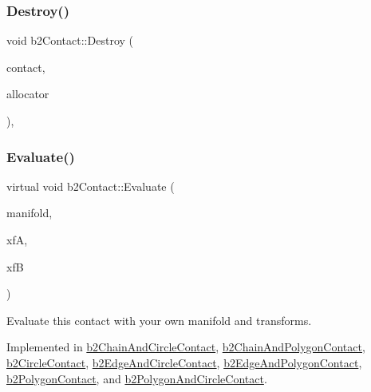 \mbox{\label{classb2_contact_ab57797a25c2206edf1ad7c4dcd1cbca5}} 
\subsubsection{\texorpdfstring{Destroy()}{Destroy()}\hspace{0.1cm}{\footnotesize\ttfamily [2/2]}}
{\footnotesize\ttfamily void b2\+Contact\+::\+Destroy (\begin{DoxyParamCaption}\item[{\mbox{\hyperlink{classb2_contact}{b2\+Contact}} $\ast$}]{contact,  }\item[{\mbox{\hyperlink{classb2_block_allocator}{b2\+Block\+Allocator}} $\ast$}]{allocator }\end{DoxyParamCaption})\hspace{0.3cm}{\ttfamily [static]}, {\ttfamily [protected]}}

\mbox{\label{classb2_contact_ae3c2842e5325b2d4500f8ed1d4de2f72}} 
\subsubsection{\texorpdfstring{Evaluate()}{Evaluate()}}
{\footnotesize\ttfamily virtual void b2\+Contact\+::\+Evaluate (\begin{DoxyParamCaption}\item[{\mbox{\hyperlink{structb2_manifold}{b2\+Manifold}} $\ast$}]{manifold,  }\item[{const \mbox{\hyperlink{structb2_transform}{b2\+Transform}} \&}]{xfA,  }\item[{const \mbox{\hyperlink{structb2_transform}{b2\+Transform}} \&}]{xfB }\end{DoxyParamCaption})\hspace{0.3cm}{\ttfamily [pure virtual]}}



Evaluate this contact with your own manifold and transforms. 



Implemented in \mbox{\hyperlink{classb2_chain_and_circle_contact_abdc7f895b76f99f7ddc444ed11986c89}{b2\+Chain\+And\+Circle\+Contact}}, \mbox{\hyperlink{classb2_chain_and_polygon_contact_a607e7a8b4b0a5ee9bfd100a365fb6f3b}{b2\+Chain\+And\+Polygon\+Contact}}, \mbox{\hyperlink{classb2_circle_contact_a90036965fd66469e916a5afc6c244092}{b2\+Circle\+Contact}}, \mbox{\hyperlink{classb2_edge_and_circle_contact_aec021f688dcf2b5a2c483edde476d4b6}{b2\+Edge\+And\+Circle\+Contact}}, \mbox{\hyperlink{classb2_edge_and_polygon_contact_ae99fba8c1cb7e5d7c11ab78ca80e775d}{b2\+Edge\+And\+Polygon\+Contact}}, \mbox{\hyperlink{classb2_polygon_contact_aa9581ba4a2bc769b80e3f107801d0950}{b2\+Polygon\+Contact}}, and \mbox{\hyperlink{classb2_polygon_and_circle_contact_a4af8338f124be0b7ec704997be4736b1}{b2\+Polygon\+And\+Circle\+Contact}}.

